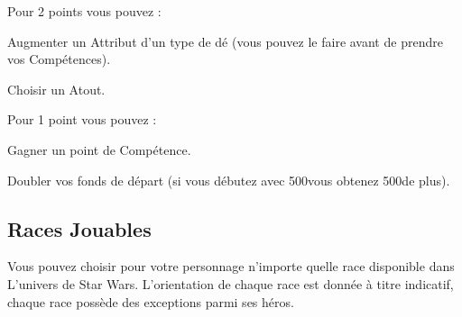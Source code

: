 Pour 2 points vous pouvez :
\begin{rebelist}
    \item Augmenter un Attribut d’un type de dé (vous pouvez le faire avant de prendre vos Compétences).
    \item Choisir un Atout.
\end{rebelist}

Pour 1 point vous pouvez :
\begin{rebelist}
    \item Gagner un point de Compétence.
    \item Doubler vos fonds de départ (si vous débutez avec 500\crg vous obtenez 500\crg de plus).
\end{rebelist}

\subsection{Races Jouables}
Vous pouvez choisir pour votre personnage n’importe quelle race disponible dans L’univers de Star Wars. L’orientation de chaque race est donnée à titre indicatif, chaque race possède des exceptions parmi ses héros.















%
%

\clearpage


\clearpage


\clearpage


\newpage


\clearpage 

